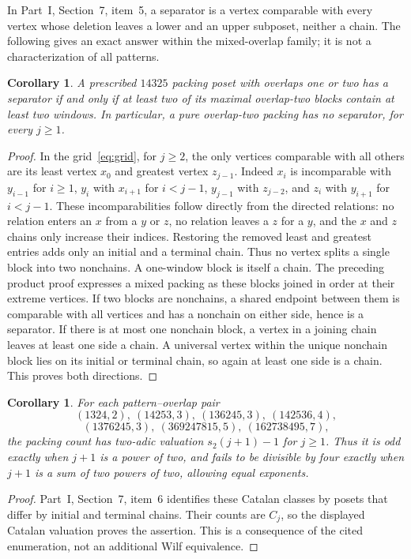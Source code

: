 \documentclass[11pt]{article}
\newtheorem{corollary}[theorem]{Corollary}
\begin{document}
In Part~I, Section~7, item~5, a separator is a vertex comparable with
every vertex whose deletion leaves a lower and an upper subposet,
neither a chain. The following gives an exact answer within the
mixed-overlap family; it is not a characterization of all patterns.
\begin{corollary}\label{cor:separator}
A prescribed $14325$ packing poset with overlaps one or two has a
separator if and only if at least two of its maximal overlap-two
blocks contain at least two windows. In particular, a pure
overlap-two packing has no separator, for every $j\geq1$.
\end{corollary}
\begin{proof}
In the grid~\eqref{eq:grid}, for $j\geq2$, the only vertices
comparable with all others are its least vertex $x_0$ and greatest
vertex $z_{j-1}$. Indeed $x_i$ is incomparable with $y_{i-1}$ for
$i\geq1$, $y_i$ with $x_{i+1}$ for $i<j-1$, $y_{j-1}$ with
$z_{j-2}$, and $z_i$ with $y_{i+1}$ for $i<j-1$.
These incomparabilities follow directly from the directed relations:
no relation enters an $x$ from a $y$ or $z$, no relation leaves a $z$
for a $y$, and the $x$ and $z$ chains only increase their indices.
Restoring the removed least and greatest entries adds only an
initial and a terminal chain. Thus no vertex splits a single block
into two nonchains. A one-window block is itself a chain.
The preceding product proof expresses a mixed packing as these
blocks joined in order at their extreme vertices. If two blocks
are nonchains, a shared endpoint between them is comparable with
all vertices and has a nonchain on either side, hence is a separator.
If there is at most one nonchain block, a vertex in a joining chain
leaves at least one side a chain. A universal vertex within the
unique nonchain block lies on its initial or terminal chain, so
again at least one side is a chain. This proves both directions.
\end{proof}

\begin{corollary}\label{cor:catalan}
For each pattern--overlap pair
\[
 (1324,2),\ (14253,3),\ (136245,3),\ (142536,4),
\]
\[
 (1376245,3),\ (369247815,5),\ (162738495,7),
\]
the packing count has two-adic valuation $s_2(j+1)-1$ for $j\geq1$.
Thus it is odd exactly when $j+1$ is a power of two, and fails to be
divisible by four exactly when $j+1$ is a sum of two powers of two,
allowing equal exponents.
\end{corollary}
\begin{proof}
Part~I, Section~7, item~6 identifies these Catalan classes by posets
that differ by initial and terminal chains. Their counts are $C_j$,
so the displayed Catalan valuation proves the assertion. This is a
consequence of the cited enumeration, not an additional Wilf equivalence.
\end{proof}
\end{document}

